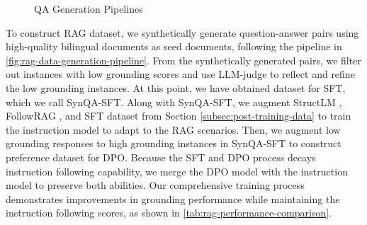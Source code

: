 \begin{figure}[h]
\centering
{}
\caption{QA Generation Pipelines}
\label{fig:rag-data-generation-pipeline}
\end{figure}

To construct RAG dataset, we synthetically generate question-answer pairs  using high-quality bilingual documents as seed documents, following the pipeline in \autoref{fig:rag-data-generation-pipeline}.
From the synthetically generated pairs, we filter out instances with low grounding scores and use LLM-judge to reflect and refine the low grounding instances.
At this point, we have obtained dataset for SFT, which we call SynQA-SFT. 
Along with SynQA-SFT, we augment StructLM \citep{zhuang2024structlmbuildinggeneralistmodels}, FollowRAG \citep{dong2024generalinstructionfollowingalignmentretrievalaugmented}, and SFT dataset from Section \ref{subsec:post-training-data} to train the instruction model to adapt to the RAG scenarios.
Then, we augment low grounding responses to high grounding instances in SynQA-SFT to construct preference dataset for DPO.
Because the SFT and DPO process decays instruction following capability, we merge the DPO model with the instruction model to preserve both abilities.
Our comprehensive training process demonstrates improvements in grounding performance while maintaining the instruction following scores, as shown in \autoref{tab:rag-performance-comparison}.

    
